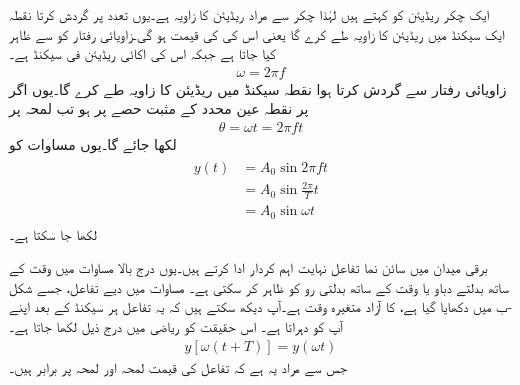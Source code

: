 ایک چکر  ریڈیئن کو کہتے ہیں لہٰذا  چکر سے مراد  ریڈیئن کا زاویہ ہے۔یوں  تعدد پر گردش کرتا نقطہ ایک سیکنڈ میں  ریڈیئن کا زاویہ طے کرے گا یعنی اس کی  کی قیمت  ہو گی۔زاویائی رفتار کو  سے ظاہر کیا جاتا ہے جبکہ اس کی اکائی ریڈیئن فی سیکنڈ  ہے۔
\begin{align}
\omega=2\pi f
\end{align}
زاویائی رفتار  سے گردش کرتا ہوا نقطہ  سیکنڈ میں  ریڈیئن کا زاویہ طے کرے گا۔یوں اگر  پر نقطہ عین  محدد کے مثبت حصے پر ہو تب لمحہ  پر
\begin{align}
\theta=\omega t=2\pi f t
\end{align}
لکھا جائے گا۔یوں مساوات   کو
\begin{gather}
\begin{aligned}\label{مساوات_بدلتا_سائن_نما_تفاعل_ب}
y(t)&=A_0 \sin 2\pi f t\\
&=A_0\sin \frac{2\pi}{T}t\\
&=A_0 \sin \omega t
\end{aligned}
\end{gather}
لکھا جا سکتا ہے۔

برقی میدان میں سائن نما تفاعل نہایت اہم کردار ادا کرتے ہیں۔یوں درج بالا مساوات میں  وقت کے ساتھ بدلتے دباو یا وقت کے ساتھ بدلتی رو کو ظاہر کر سکتی ہے۔ 
مساوات  میں دیے تفاعل، جسے شکل -ب میں دکھایا گیا ہے،  کا آزاد متغیرہ وقت  ہے۔آپ دیکھ سکتے ہیں کہ یہ تفاعل ہر  سیکنڈ کے بعد اپنے آپ کو دہراتا ہے۔ اس حقیقت کو ریاضی میں درج ذیل لکھا جاتا ہے۔
\begin{align}
y[\omega(t+T)]=y(\omega t)
\end{align}
جس سے مراد یہ ہے کہ تفاعل کی قیمت لمحہ  اور لمحہ  پر برابر ہیں۔

